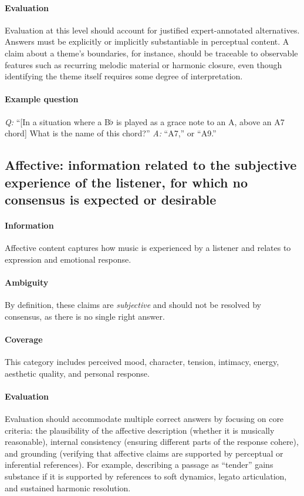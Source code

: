 \documentclass[conference,a4paper]{APSIPA2026}
\begin{document}
\paragraph{Evaluation}
Evaluation at this level should account for justified expert-annotated alternatives. Answers must be explicitly or implicitly substantiable in perceptual content. A claim about a theme’s boundaries, for instance, should be traceable to observable features such as recurring melodic material or harmonic closure, even though identifying the theme itself requires some degree of interpretation.

\paragraph{Example question}
\emph{Q:} ``[In a situation where a B$\flat$ is played as a grace note to an A, above an A7 chord] What is the name of this chord?''  
\emph{A:} ``A7,'' or ``A9.''





\subsection{\textbf{Affective}: information related to the subjective experience of the listener, for which no consensus is expected or desirable}

\paragraph{Information}
Affective content captures how music is experienced by a listener and relates to expression and emotional response.

\paragraph{Ambiguity}
By definition, these claims are \emph{subjective} and should not be resolved by consensus, as there is no single right answer.

\paragraph{Coverage}
This category includes perceived mood, character, tension, intimacy, energy, aesthetic quality, and personal response. 

\paragraph{Evaluation}
Evaluation should accommodate multiple correct answers by focusing on core criteria: the plausibility of the affective description (whether it is musically reasonable), internal consistency (ensuring different parts of the response cohere), and grounding (verifying that affective claims are supported by perceptual or inferential references). For example, describing a passage as ``tender'' gains substance if it is supported by references to soft dynamics, legato articulation, and sustained harmonic resolution.
\end{document}
